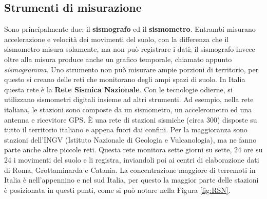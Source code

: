 \documentclass[a4paper,10pt]{memoir}
\begin{document}
\subsection{Strumenti di misurazione}
Sono principalmente due: il \textbf{sismografo} ed il \textbf{sismometro}.
Entrambi misurano accelerazione e velocità dei movimenti del suolo, con la differenza che il sismometro misura solamente, ma non può registrare i dati; il sismografo invece oltre alla misura produce anche un grafico temporale, chiamato appunto \textit{sismogramma}.
Uno strumento non può misurare ampie porzioni di territorio, per questo si creano delle reti che monitorano degli ampi spazi di suolo. In Italia questa rete è la \textbf{Rete Sismica Nazionale}.
Con le tecnologie odierne, si utilizzano sismometri digitali insieme ad altri strumenti. Ad esempio, nella rete italiana, le stazioni sono composte da un sismometro, un accelerometro ed una antenna e ricevitore GPS.
È una rete di stazioni sismiche (circa 300) disposte su tutto il territorio italiano e appena fuori dai confini.
Per la maggioranza sono stazioni dell'INGV (Istituto Nazionale di Geologia e Vulcanologia), ma ne fanno parte anche altre piccole reti.
Questa rete monitora sette giorni su sette, 24 ore su 24 i movimenti del suolo e li registra, inviandoli poi ai centri di elaborazione dati di Roma, Grottaminarda e Catania.
La concentrazione maggiore di terremoti in Italia è nell'appennino e nel sud Italia, per questo la maggior parte delle stazioni è posizionata in questi punti, come si può notare nella Figura \ref{fig:RSN}.

\clearpage
\end{document}
